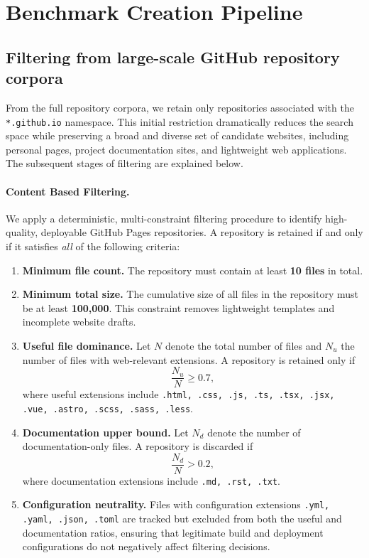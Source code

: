 \section{Benchmark Creation Pipeline}

\subsection{Filtering from large-scale GitHub repository corpora}
From the full repository corpora, we retain only repositories associated with the \texttt{*.github.io} namespace. This initial restriction dramatically reduces the search space while preserving a broad and diverse set of candidate websites, including personal pages, project documentation sites, and lightweight web applications. The subsequent stages of filtering are explained below.

\paragraph{Content Based Filtering.}
We apply a deterministic, multi-constraint filtering procedure to identify high-quality, deployable GitHub Pages repositories. A repository is retained if and only if it satisfies \emph{all} of the following criteria:

\begin{enumerate}

    \item \textbf{Minimum file count.} The repository must contain at least \textbf{10 files} in total.

    \item \textbf{Minimum total size.} The cumulative size of all files in the repository must be at least \textbf{100,000}. This constraint removes lightweight templates and incomplete website drafts.

    \item \textbf{Useful file dominance.} Let $N$ denote the total number of files and $N_u$ the number of files with web-relevant extensions. A repository is retained only if
    \[
        \frac{N_u}{N} \geq 0.7,
    \]
    where useful extensions include
    \texttt{.html, .css, .js, .ts, .tsx, .jsx, .vue, .astro, .scss, .sass, .less}.

    \item \textbf{Documentation upper bound.} Let $N_d$ denote the number of documentation-only files. A repository is discarded if
    \[
        \frac{N_d}{N} > 0.2,
    \]
    where documentation extensions include
    \texttt{.md, .rst, .txt}.

    \item \textbf{Configuration neutrality.} Files with configuration extensions
    \texttt{.yml, .yaml, .json, .toml}
    are tracked but excluded from both the useful and documentation ratios, ensuring that legitimate build and deployment configurations do not negatively affect filtering decisions.
\end{enumerate}


